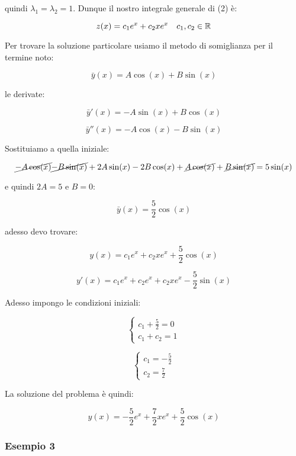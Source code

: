 quindi \(\lambda_1=\lambda_2=1\). Dunque il nostro integrale generale di (2) è:

\[
    z(x) = c_1 e ^{x} + c_2 x e ^{x} \quad c_1,c_2 \in \mathbb{R}
\]

Per trovare la soluzione particolare usiamo il metodo di somiglianza per il termine noto:

\[
    \bar{y} (x) = A \cos(x) + B \sin(x)
\]

le derivate:

\[
    \bar{y} '(x)  = -A \sin(x) + B \cos(x)
\]

\[
    \bar{y} ''(x)  = -A \cos(x) - B \sin(x)
\]


Sostituiamo a quella iniziale:

\[
    \cancel{-A \cos(x)} \cancel{- B\sin(x)} + 2A \sin(x) - 2B \cos(x)+ \cancel{A \cos(x)} + \cancel{B\sin(x)} = 5\sin(x)
\]

e quindi \(2A = 5\) e \(B=0\):

\[
    \bar{y} (x) = \frac{5}{2} \cos(x)
\]

adesso devo trovare:

\[
    y(x) = c_1 e ^{x}+ c_2 x e ^{x} + \frac{5}{2} \cos(x)
\]

\[
    y'(x)  = c_1 e ^{x} + c_2 e ^{x} + c_2x e ^{x} - \frac{5}{2}\sin(x)
\]

Adesso impongo le condizioni iniziali:

\begin{equation*}
    \begin{cases*}
        c_1 +\frac{5}{2}=0 \\
        c_1+c_2= 1
    \end{cases*}
\end{equation*}

\begin{equation*}
    \begin{cases*}
        c_1 = -\frac{5}{2} \\
        c_2 = \frac{7}{2}
    \end{cases*}
\end{equation*}

La soluzione del problema è quindi:

\[
    y(x) = -\frac{5}{2}e ^{x}+ \frac{7}{2} x e ^{x} + \frac{5}{2} \cos(x)
\]

\filbreak{}
\subsubsection*{Esempio 3}

